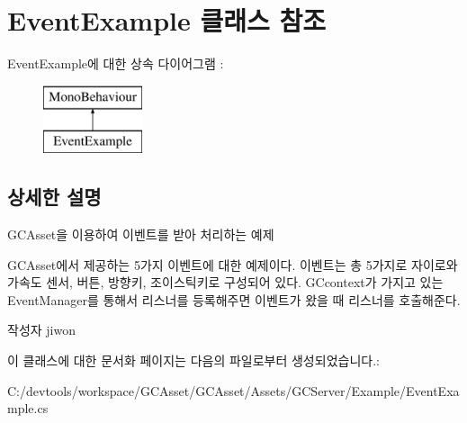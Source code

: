 \hypertarget{class_event_example}{}\section{Event\+Example 클래스 참조}
\label{class_event_example}
Event\+Example에 대한 상속 다이어그램 \+: \begin{figure}[H]
\begin{center}
\leavevmode
\includegraphics[height=2.000000cm]{class_event_example}
\end{center}
\end{figure}


\subsection{상세한 설명}
G\+C\+Asset을 이용하여 이벤트를 받아 처리하는 예제

G\+C\+Asset에서 제공하는 5가지 이벤트에 대한 예제이다. 이벤트는 총 5가지로 자이로와 가속도 센서, 버튼, 방향키, 조이스틱키로 구성되어 있다. G\+Ccontext가 가지고 있는 Event\+Manager를 통해서 리스너를 등록해주면 이벤트가 왔을 때 리스너를 호출해준다. \begin{DoxyAuthor}{작성자}
jiwon 
\end{DoxyAuthor}


이 클래스에 대한 문서화 페이지는 다음의 파일로부터 생성되었습니다.\+:\begin{DoxyCompactItemize}
\item 
C\+:/devtools/workspace/\+G\+C\+Asset/\+G\+C\+Asset/\+Assets/\+G\+C\+Server/\+Example/Event\+Example.\+cs\end{DoxyCompactItemize}

